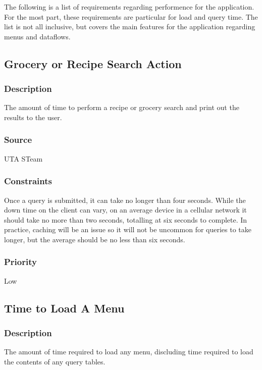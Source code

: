The following is a list of requirements regarding performence for the application.  For the most part, these requirements are particular for load and query time.  The list is not all inclusive, but covers the main features for the application regarding menus and dataflows.
\subsection{Grocery or Recipe Search Action}
\subsubsection{Description}
The amount of time to perform a recipe or grocery search and print out the results to the user.
\subsubsection{Source}
UTA STeam
\subsubsection{Constraints}
Once a query is submitted, it can take no longer than four seconds.  
While the down time on the client can vary, on an average device in a cellular network it should take no more than two seconds, totalling at six seconds to complete.
In practice, caching will be an issue so it will not be uncommon for queries to take longer, but the average should be no less than six seconds.
\subsubsection{Priority}
Low

\subsection{Time to Load A Menu}
\subsubsection{Description}
The amount of time required to load any menu, discluding time required to load the contents of any query tables.
